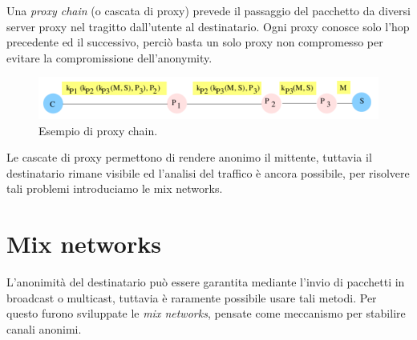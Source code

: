 \documentclass[a4paper, 11pt, twoside, openright, fleqn]{report}
\begin{document}
Una \emph{proxy chain} (o cascata di proxy) prevede il passaggio del pacchetto da diversi server proxy nel tragitto dall'utente al destinatario. Ogni proxy conosce solo l'hop precedente ed il successivo, perciò basta un solo proxy non compromesso per evitare la compromissione dell'anonymity.
\begin{figure}[htp]
	\centering
	\includegraphics[width=\textwidth]{images/proxychain}
	\caption{Esempio di proxy chain.}
\end{figure}

Le cascate di proxy permettono di rendere anonimo il mittente, tuttavia il destinatario rimane visibile ed l'analisi del traffico è ancora possibile, per risolvere tali problemi introduciamo le mix networks.

\section{Mix networks}
L'anonimità del destinatario può essere garantita mediante l'invio di pacchetti in broadcast o multicast, tuttavia è raramente possibile usare tali metodi. Per questo furono sviluppate le \emph{mix networks}, pensate come meccanismo per stabilire canali anonimi.
\end{document}
